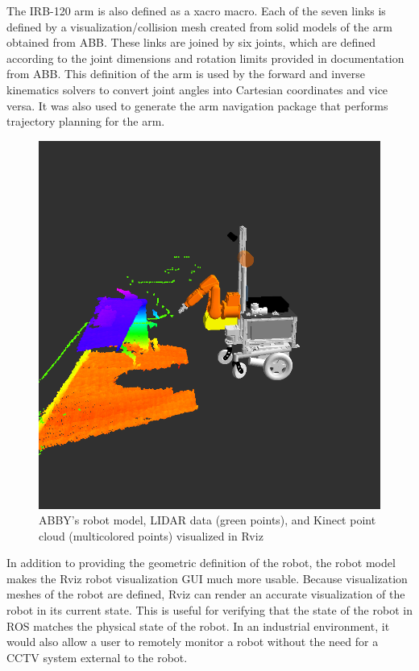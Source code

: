 \documentclass[]{cwru} %
\begin{document}
The IRB-120 arm is also defined as a xacro macro. Each of the seven
links is defined by a visualization/collision mesh created from solid
models of the arm obtained from ABB. These links are joined by six
joints, which are defined according to the joint dimensions and rotation
limits provided in documentation from ABB. This definition of the arm is
used by the forward and inverse kinematics solvers to convert joint
angles into Cartesian coordinates and vice versa. It was also used to
generate the arm navigation package that performs trajectory planning
for the arm.

\begin{figure}[ht]
\centering
\includegraphics[width=6.0in]{rviz}
\caption{ABBY’s robot model, LIDAR data (green points), and Kinect point 
cloud (multicolored points) visualized in Rviz}
\label{fig:rviz}
\end{figure}

In addition to providing the geometric definition of the robot, the
robot model makes the Rviz robot visualization GUI much more usable.
Because visualization meshes of the robot are defined, Rviz can render
an accurate visualization of the robot in its current state. This is
useful for verifying that the state of the robot in ROS matches the
physical state of the robot. In an industrial environment, it would also
allow a user to remotely monitor a robot without the need for a CCTV
system external to the robot.
\end{document}
